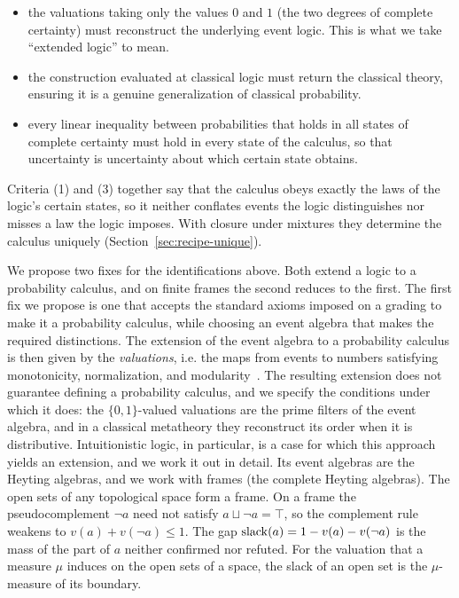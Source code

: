 \begin{itemize}
  \item[(1)] the valuations taking only the values $0$ and 
$1$ (the two degrees of complete certainty) must reconstruct the underlying event logic.
This is what we take ``extended logic'' to mean.
  \item[(2)] the construction evaluated at 
classical logic must return the classical theory, ensuring it is a genuine generalization 
of classical probability.
  \item[(3)] every linear inequality between probabilities that holds in all 
states of complete certainty must hold in every state of the calculus, so that 
uncertainty is uncertainty about which certain state obtains.
\end{itemize}

\noindent
Criteria (1) and (3) together say that the calculus obeys exactly the
laws of the logic's certain states, so it neither conflates events the
logic distinguishes nor misses a law the logic imposes. With closure
under mixtures they determine the calculus uniquely
(Section~\ref{sec:recipe-unique}).

We propose two fixes for the identifications above. Both extend a logic
to a probability calculus, and on finite frames the second reduces to
the first. 
The first fix we propose is one that accepts the standard axioms imposed on a grading 
to make it a probability calculus, while choosing an event algebra that 
makes the required distinctions. 
The extension of the event algebra to a probability calculus is then given by 
the \emph{valuations}, i.e. the maps from events to numbers satisfying monotonicity, 
normalization, and modularity~\cite{weatherson2003,paris2001}. The resulting extension does not guarantee
defining a probability calculus, and we specify the conditions under which it
does: the $\{0,1\}$-valued valuations are the prime filters of the event
algebra, and in a classical metatheory they reconstruct its order when it
is distributive. 
Intuitionistic logic, in
particular, is a case for which this approach yields an extension, and we
work it out in detail. Its event algebras are the Heyting algebras, and we 
work with frames (the complete Heyting algebras). The open sets of any topological space
form a frame. On a frame the pseudocomplement $\neg a$ need not satisfy
$a \sqcup \neg a = \top$, so the complement rule weakens to
$v(a) + v(\neg a) \le 1$. The gap
$\mathrm{slack}(a) = 1 - v(a) - v(\neg a)$ is the mass of the part of $a$
neither confirmed nor refuted. For the valuation that a measure $\mu$
induces on the open sets of a space, the slack of an open set is the
$\mu$-measure of its boundary.

